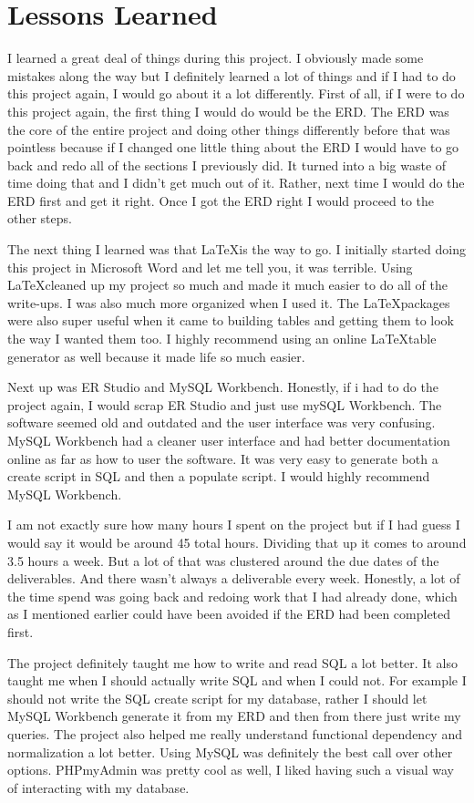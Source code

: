 \documentclass[11pt, a4paper]{report}
\begin{document}
\chapter{Lessons Learned}
\par I learned a great deal of things during this project. I obviously made some mistakes along the way but I definitely learned a lot of things and if I had to do this project again, I would go about it a lot differently. First of all, if I were to do this project again, the first thing I would do would be the ERD. The ERD was the core of the entire project and doing other things differently before that was pointless because if I changed one little thing about the ERD I would have to go back and redo all of the sections I previously did. It turned into a big waste of time doing that and I didn't get much out of it. Rather, next time I would do the ERD first and get it right. Once I got the ERD right I would proceed to the other steps.
\\
\par The next thing I learned was that \LaTeX is the way to go. I initially started doing this project in Microsoft Word and let me tell you, it was terrible. Using \LaTeX cleaned up my project so much and made it much easier to do all of the write-ups. I was also much more organized when I used it. The \LaTeX packages were also super useful when it came to building tables and getting them to look the way I wanted them too. I highly recommend using an online \LaTeX table generator as well because it made life so much easier.
\\ 
\par Next up was ER Studio and MySQL Workbench. Honestly, if i had to do the project again, I would scrap ER Studio and just use mySQL Workbench. The software seemed old and outdated and the user interface was very confusing. MySQL Workbench had a cleaner user interface and had better documentation online as far as how to user the software. It was very easy to generate both a create script in SQL and then a populate script. I would highly recommend MySQL Workbench.
\\
\par I am not exactly sure how many hours I spent on the project but if I had guess I would say it would be around 45 total hours. Dividing that up it comes to around 3.5 hours a week. But a lot of that was clustered around the due dates of the deliverables. And there wasn't always a deliverable every week. Honestly, a lot of the time spend was going back and redoing work that I had already done, which as I mentioned earlier could have been avoided if the ERD had been completed first.
\\
\par The project definitely taught me how to write and read SQL a lot better. It also taught me when I should actually write SQL and when I could not. For example I should not write the SQL create script for my database, rather I should let MySQL Workbench generate it from my ERD and then from there just write my queries. The project also helped me really understand functional dependency and normalization a lot better. Using MySQL was definitely the best call over other options. PHPmyAdmin was pretty cool as well, I liked having such a visual way of interacting with my database.
\end{document}
